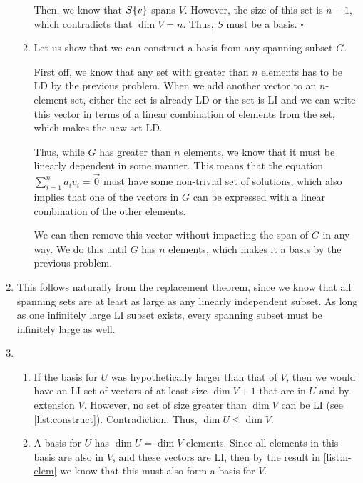 \documentclass[12pt]{article}
\begin{document}
\begin{enumerate}
\begin{enumerate}
                        Then, we know that $S \\ \{v\}$ spans $V$.
                        However, the size of this set is $n-1$, which contradicts that $\dim V=n$.
                        Thus, $S$ must be a basis. $\square$ \label{list:n-elem}
                  \item Let us show that we can construct a basis from any spanning subset $G$.

                        First off, we know that any set with greater than $n$ elements has to be LD
                        by the previous problem.
                        When we add another vector to an $n$-element set, either the set is already LD
                        or the set is LI and we can write this vector in terms of a linear combination of elements from the set,
                        which makes the new set LD.

                        Thus, while $G$ has greater than $n$ elements, we know that it must be linearly dependent in some manner.
                        This means that the equation $\sum_{i=1}^n a_i v_i=\vec{0}$ must have some non-trivial set of solutions,
                        which also implies that one of the vectors in $G$ can be expressed with a linear combination of the other elements.

                        We can then remove this vector without impacting the span of $G$ in any way.
                        We do this until $G$ has $n$ elements, which makes it a basis by the previous problem.
                        \label{list:construct}
            \end{enumerate}
      \item This follows naturally from the replacement theorem, since we know
            that all spanning sets are at least as large as any linearly independent subset.
            As long as one infinitely large LI subset exists, every spanning subset must be infinitely large as well.
      \item \begin{enumerate}
                  \item If the basis for $U$ was hypothetically larger than that of $V$,
                        then we would have an LI set of vectors of at least size $\dim V +1$ that are in $U$ and by extension $V$.
                        However, no set of size greater than $\dim V$ can be LI (see \ref{list:construct}).
                        Contradiction. Thus, $\dim U \le \dim V$. \label{list:dim}
                  \item A basis for $U$ has $\dim U=\dim V$ elements.
                        Since all elements in this basis are also in $V$, and these vectors are LI,
                        then by the result in \ref{list:n-elem} we know that this must also form a basis for $V$.


\end{enumerate}
\end{enumerate}
\end{document}
